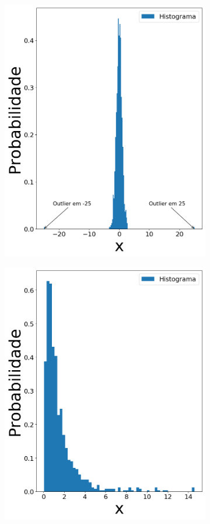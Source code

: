 \begin{figure}[H]
\begin{subfigure}[b]{0.27\textwidth}
	\includegraphics[width=\linewidth]{./figuras/datanormal_25}
	\caption{}
	\label{fig:randn_out}
\end{subfigure}
\hfill
\begin{subfigure}[b]{0.27\textwidth}
	\centering 
	\includegraphics[width=\linewidth]{./figuras/datalognormal_0}

\end{subfigure}
\end{figure}
